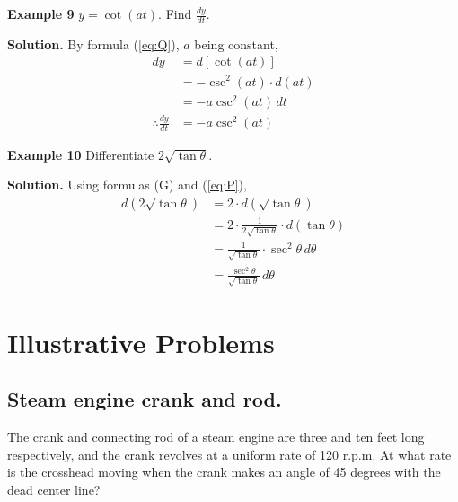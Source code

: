 \textbf{Example 9}
$y = \cot(at)$. Find $\frac{dy}{dt}$.

\noindent\textbf{Solution.} By formula (\eqref{eq:Q}), $a$ being constant,
\begin{align*}
dy &= d[\cot(at)] \\
&= -\csc^2(at)\cdot d(at) \\
&= -a\csc^2(at)\,dt \\
\therefore \frac{dy}{dt} &= -a\csc^2(at)
\end{align*}

\textbf{Example 10}
Differentiate $2\sqrt{\tan\theta}$.

\noindent\textbf{Solution.} Using formulas (G) and (\eqref{eq:P}),
\begin{align*}
d(2\sqrt{\tan\theta}) &= 2\cdot d(\sqrt{\tan\theta}) \\
&= 2\cdot \frac{1}{2\sqrt{\tan\theta}}\cdot d(\tan\theta) \\
&= \frac{1}{\sqrt{\tan\theta}}\cdot \sec^2\theta\,d\theta \\
&= \frac{\sec^2\theta}{\sqrt{\tan\theta}}\,d\theta
\end{align*}

\section{Illustrative Problems}

\subsection*{Steam engine crank and rod.}

The crank and connecting rod of a steam engine are three and ten feet long respectively, and the crank revolves at a uniform rate of 120 r.p.m. At what rate is the crosshead moving when the crank makes an angle of 45 degrees with the dead center line?

